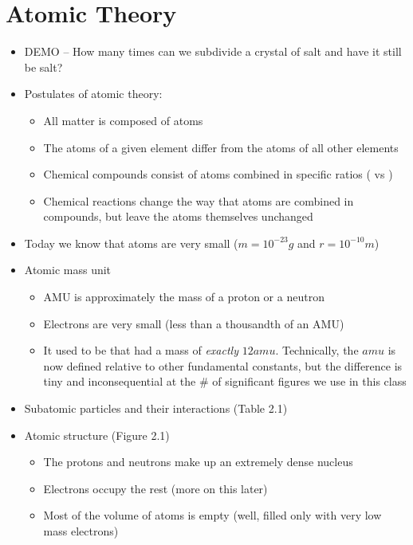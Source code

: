 \documentclass[12pt, openany, letterpaper]{memoir}
\begin{document}
\section{Atomic Theory}
\begin{itemize}
	\item DEMO -- How many times can we subdivide a crystal of salt and have it still be salt?
	\item Postulates of atomic theory:
	      \begin{itemize}
		      \item All matter is composed of atoms
		      \item The atoms of a given element differ from the atoms of all other elements
		      \item Chemical compounds consist of atoms combined in specific ratios ( vs )
		      \item Chemical reactions change the way that atoms are combined in compounds, but leave the atoms themselves unchanged
	      \end{itemize}
	\item Today we know that atoms are very small ($m=10^{-23}g$ and $r=10^{-10}m$)
	\item Atomic mass unit
	      \begin{itemize}
		      \item AMU is approximately the mass of a proton or a neutron
		      \item Electrons are very small (less than a thousandth of an AMU)
		      \item It used to be that  had a mass of \emph{exactly} $12amu$. Technically, the $amu$ is now defined relative to other fundamental constants, but the difference is tiny and inconsequential at the \# of significant figures we use in this class
	      \end{itemize}
	\item Subatomic particles and their interactions (Table 2.1)
	\item Atomic structure (Figure 2.1)
	      \begin{itemize}
		      \item The protons and neutrons make up an extremely dense nucleus
		      \item Electrons occupy the rest (more on this later)
		      \item Most of the volume of atoms is empty (well, filled only with very low mass electrons)
	      \end{itemize}
\end{itemize}
\end{document}
